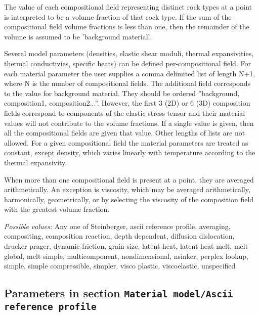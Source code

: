 \begin{itemize}
 The value of each compositional field representing distinct rock types at a point is interpreted to be a volume fraction of that rock type. If the sum of the compositional field volume fractions is less than one, then the remainder of the volume is assumed to be 'background material'.

 Several model parameters (densities, elastic shear moduli, thermal expansivities, thermal conductivies, specific heats) can be defined per-compositional field. For each material parameter the user supplies a comma delimited list of length N+1, where N is the number of compositional fields. The additional field corresponds to the value for background material. They should be ordered ''background, composition1, composition2...''. However, the first 3 (2D) or 6 (3D) composition fields correspond to components of the elastic stress tensor and their material values will not contribute to the volume fractions. If a single value is given, then all the compositional fields are given that value. Other lengths of lists are not allowed. For a given compositional field the material parameters are treated as constant, except density, which varies linearly with temperature according to the thermal expansivity. 

 When more than one compositional field is present at a point, they are averaged arithmetically. An exception is viscosity, which may be averaged arithmetically, harmonically, geometrically, or by selecting the viscosity of the composition field with the greatest volume fraction.


{\it Possible values:} Any one of Steinberger, ascii reference profile, averaging, compositing, composition reaction, depth dependent, diffusion dislocation, drucker prager, dynamic friction, grain size, latent heat, latent heat melt, melt global, melt simple, multicomponent, nondimensional, nsinker, perplex lookup, simple, simple compressible, simpler, visco plastic, viscoelastic, unspecified
\end{itemize}



\subsection{Parameters in section \tt Material model/Ascii reference profile}
\label{parameters:Material_20model/Ascii_20reference_20profile}

